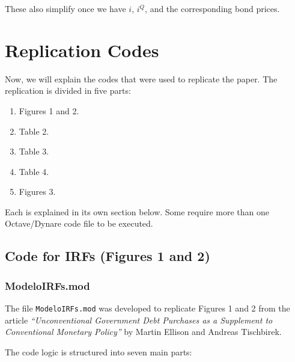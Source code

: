 \documentclass[12pt]{article}
\begin{document}
These also simplify once we have $i$, $i^Q$, and the corresponding bond prices.



\newpage
\section{Replication Codes}

Now, we will explain the codes that were used to replicate the paper. The replication is divided in five parts:

\begin{enumerate}
    \item Figures 1 and 2.
    \item Table 2.
    \item Table 3.
    \item Table 4.
    \item Figures 3.
\end{enumerate}

Each is explained in its own section below. Some require more than one Octave/Dynare code file to be executed.


\subsection{Code for IRFs (Figures 1 and 2)}

\subsubsection{ModeloIRFs.mod}

The file \texttt{ModeloIRFs.mod} was developed to replicate Figures 1 and 2 from the article \textit{“Unconventional Government Debt Purchases as a Supplement to Conventional Monetary Policy”} by Martin Ellison and Andreas Tischbirek.

The code logic is structured into seven main parts:
\end{document}
